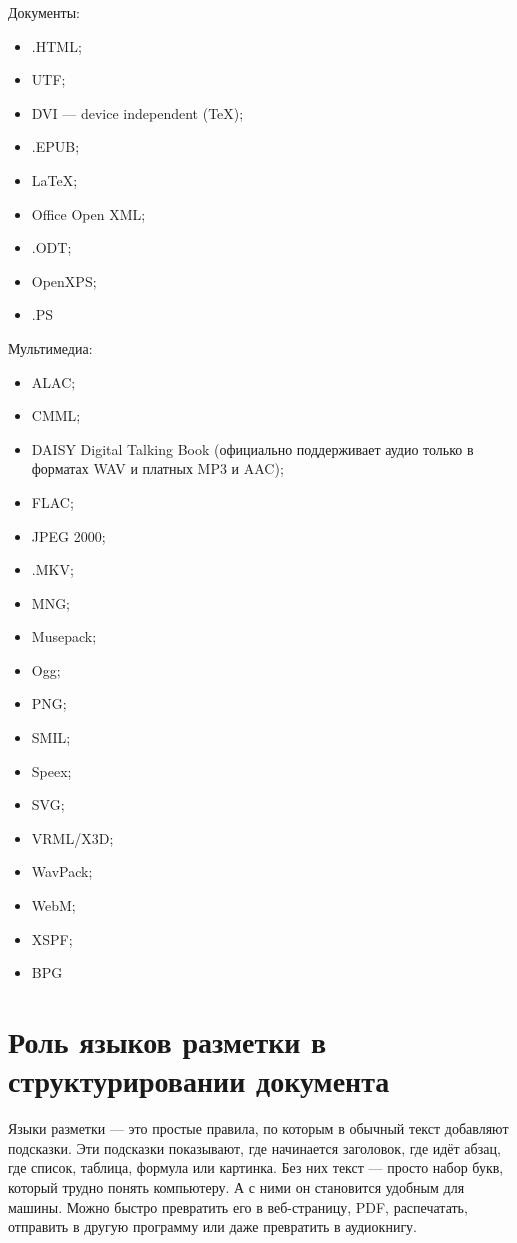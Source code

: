 \documentclass{ou}
\begin{document}
Документы:
\begin{itemize}
    \item .HTML;
    \item UTF;
    \item DVI — device independent (TeX);
    \item .EPUB;
    \item LaTeX;
    \item Office Open XML;
    \item .ODT;
    \item OpenXPS;
    \item .PS
\end{itemize}

Мультимедиа:
\begin{itemize}
    \item ALAC;
    \item CMML;
    \item DAISY Digital Talking Book (официально поддерживает аудио только в форматах WAV и платных MP3 и AAC);
    \item FLAC;
    \item JPEG 2000;
    \item .MKV;
    \item MNG;
    \item Musepack;
    \item Ogg;
    \item PNG;
    \item SMIL;
    \item Speex;
    \item SVG;
    \item VRML/X3D;
    \item WavPack;
    \item WebM;
    \item XSPF;
    \item BPG
\end{itemize}
\newpage
\section{Роль языков разметки в структурировании документа}
Языки разметки — это простые правила, по которым в обычный текст добавляют подсказки. Эти подсказки показывают, где начинается заголовок, где идёт абзац, где список, таблица, формула или картинка. Без них текст — просто набор букв, который трудно понять компьютеру. А с ними он становится удобным для машины. Можно быстро превратить его в веб-страницу, PDF, распечатать, отправить в другую программу или даже превратить в аудиокнигу.
\end{document}
